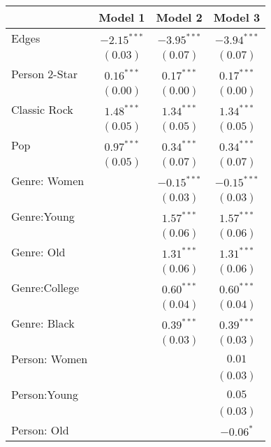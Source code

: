 
\begin{table}
\begin{center}
\begin{tabular}{l c c c}
\toprule
 & Model 1 & Model 2 & Model 3 \\
\midrule
Edges          & $-2.15^{***}$ & $-3.95^{***}$ & $-3.94^{***}$ \\
               & $(0.03)$      & $(0.07)$      & $(0.07)$      \\
Person 2-Star  & $0.16^{***}$  & $0.17^{***}$  & $0.17^{***}$  \\
               & $(0.00)$      & $(0.00)$      & $(0.00)$      \\
Classic Rock   & $1.48^{***}$  & $1.34^{***}$  & $1.34^{***}$  \\
               & $(0.05)$      & $(0.05)$      & $(0.05)$      \\
Pop            & $0.97^{***}$  & $0.34^{***}$  & $0.34^{***}$  \\
               & $(0.05)$      & $(0.07)$      & $(0.07)$      \\
Genre: Women   &               & $-0.15^{***}$ & $-0.15^{***}$ \\
               &               & $(0.03)$      & $(0.03)$      \\
Genre:Young    &               & $1.57^{***}$  & $1.57^{***}$  \\
               &               & $(0.06)$      & $(0.06)$      \\
Genre: Old     &               & $1.31^{***}$  & $1.31^{***}$  \\
               &               & $(0.06)$      & $(0.06)$      \\
Genre:College  &               & $0.60^{***}$  & $0.60^{***}$  \\
               &               & $(0.04)$      & $(0.04)$      \\
Genre: Black   &               & $0.39^{***}$  & $0.39^{***}$  \\
               &               & $(0.03)$      & $(0.03)$      \\
Person: Women  &               &               & $0.01$        \\
               &               &               & $(0.03)$      \\
Person:Young   &               &               & $0.05$        \\
               &               &               & $(0.03)$      \\
Person: Old    &               &               & $-0.06^{*}$   \\

\end{tabular}
\end{center}
\end{table}
